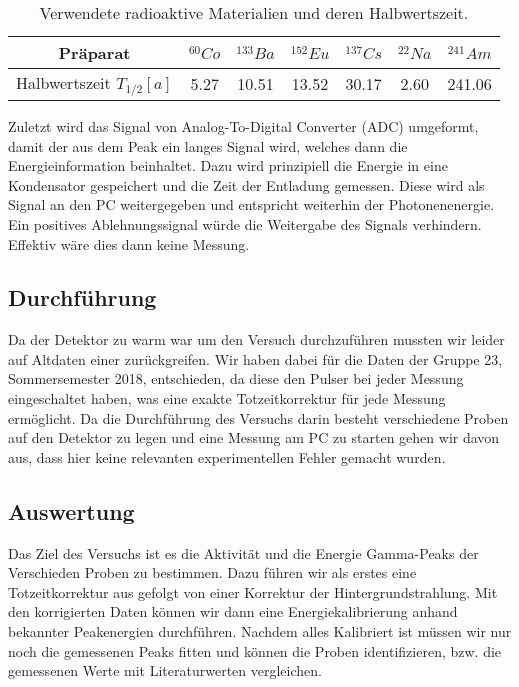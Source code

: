 \documentclass[]{article}
\begin{document}
\begin{table}[H]
\centering
\begin{tabular}{c|c|c|c|c|c|c}
Präparat & $^{60}Co$& $^{133}Ba$& $^{152}Eu$& $^{137}Cs$& $^{22}Na$ & $^{241}Am$ \\ \hline 
Halbwertszeit $T_{1/2} [a]$ & 5.27 & 10.51 & 13.52 & 30.17 & 2.60 & 241.06  \\ 
\end{tabular}
\caption{Verwendete radioaktive Materialien und deren Halbwertszeit.}
\label{tab:T 1/2}
\end{table}

Zuletzt wird das Signal von Analog-To-Digital Converter (ADC) umgeformt, damit der aus dem Peak ein langes Signal wird, welches dann die Energieinformation beinhaltet. Dazu wird prinzipiell die Energie in eine Kondensator gespeichert und die Zeit der Entladung gemessen. Diese wird als Signal an den PC weitergegeben und entspricht weiterhin der Photonenenergie. Ein positives Ablehnungssignal würde die Weitergabe des Signals verhindern. Effektiv wäre dies dann keine Messung.

\subsection{Durchführung}
Da der Detektor zu warm war um den Versuch durchzuführen mussten wir leider auf Altdaten einer zurückgreifen. Wir haben dabei für die Daten der Gruppe 23, Sommersemester 2018, entschieden, da diese den Pulser bei jeder Messung eingeschaltet haben, was eine exakte Totzeitkorrektur für jede Messung ermöglicht. Da die Durchführung des Versuchs darin besteht verschiedene Proben auf den Detektor zu legen und eine Messung am PC zu starten gehen wir davon aus, dass hier keine relevanten experimentellen Fehler gemacht wurden. 
\subsection{Auswertung}
Das Ziel des Versuchs ist es die Aktivität und die Energie Gamma-Peaks der Verschieden Proben zu bestimmen. Dazu führen wir als erstes eine Totzeitkorrektur aus gefolgt von einer Korrektur der Hintergrundstrahlung. Mit den korrigierten Daten können wir dann eine Energiekalibrierung anhand bekannter Peakenergien durchführen. Nachdem alles Kalibriert ist müssen wir nur noch die gemessenen Peaks fitten und können die Proben identifizieren, bzw. die gemessenen Werte mit Literaturwerten vergleichen. 
\end{document}
